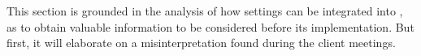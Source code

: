 This section is grounded in the analysis of how settings can be integrated into \launcher, as to obtain valuable information to be considered before its implementation.
But first, it will elaborate on a misinterpretation found during the client meetings.